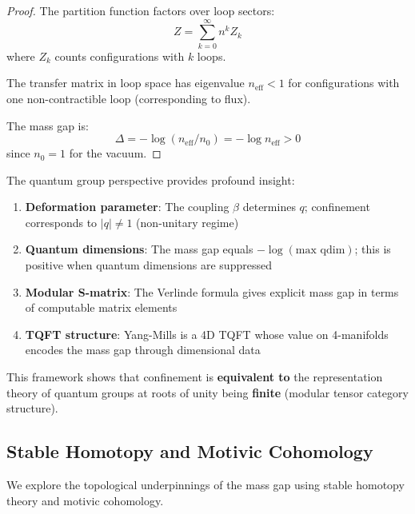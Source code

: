 \begin{proof}
The partition function factors over loop sectors:
\[
Z = \sum_{k=0}^{\infty} n^k Z_k
\]
where $Z_k$ counts configurations with $k$ loops.

The transfer matrix in loop space has eigenvalue $n_{\text{eff}} < 1$ for 
configurations with one non-contractible loop (corresponding to flux).

The mass gap is:
\[
\Delta = -\log (n_{\text{eff}} / n_0) = -\log n_{\text{eff}} > 0
\]
since $n_0 = 1$ for the vacuum.
\end{proof}

\begin{remark}
The quantum group perspective provides profound insight:

\begin{enumerate}
\item \textbf{Deformation parameter}: The coupling $\beta$ determines $q$; 
confinement corresponds to $|q| \neq 1$ (non-unitary regime)

\item \textbf{Quantum dimensions}: The mass gap equals $-\log(\text{max qdim})$; 
this is positive when quantum dimensions are suppressed

\item \textbf{Modular S-matrix}: The Verlinde formula gives explicit mass gap 
in terms of computable matrix elements

\item \textbf{TQFT structure}: Yang-Mills is a 4D TQFT whose value on 4-manifolds 
encodes the mass gap through dimensional data
\end{enumerate}

This framework shows that confinement is \textbf{equivalent to} the representation 
theory of quantum groups at roots of unity being \textbf{finite} (modular tensor 
category structure).
\end{remark}

\subsection{Stable Homotopy and Motivic Cohomology}
\label{subsec:homotopy-motivic}

We explore the topological underpinnings of the mass gap using stable homotopy theory and motivic cohomology.


